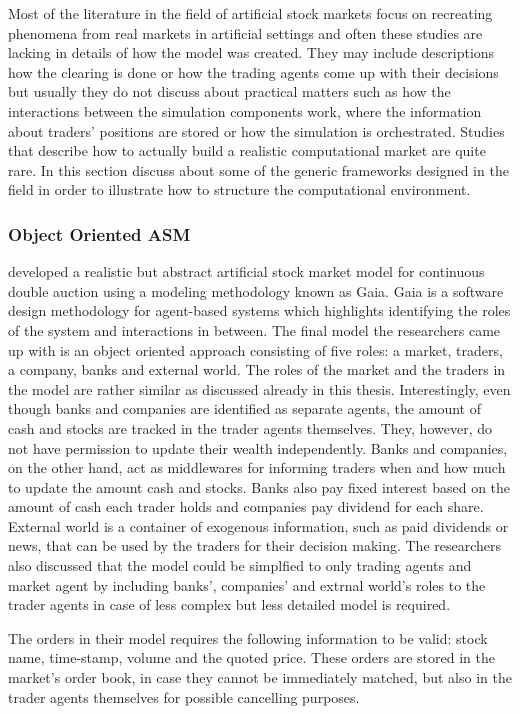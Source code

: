 Most of the literature in the field of artificial stock markets 
focus on recreating phenomena from real markets in artificial settings
and often these studies are lacking in details of how the model was created.
They may include descriptions how the clearing is done or how the trading agents 
come up with their decisions but usually they do not discuss about practical matters 
such as how the interactions between the simulation components work, where the 
information about traders' positions are stored or how the simulation is orchestrated. 
Studies that describe how to actually build a realistic computational 
market are quite rare. In this section discuss about some of the generic
frameworks designed in the field in order to illustrate how to structure the computational
environment.


\subsubsection{Object Oriented ASM}
\citet{Ben12} developed a realistic but abstract artificial stock market
model for continuous double auction using a modeling methodology known as 
Gaia. Gaia is a software design methodology for agent-based systems which 
highlights identifying the roles of the system and interactions in between.
The final model the researchers came up with is an object oriented 
approach consisting of five roles: a market, traders, a company, banks
and external world. The roles of the market and the traders in the model 
are rather similar as discussed already in this thesis. Interestingly,
even though banks and companies are identified as separate agents, 
the amount of cash and stocks are tracked in the trader agents themselves.
They, however, do not have permission to update their wealth independently. 
Banks and companies, on the other hand, act as middlewares for informing 
traders when and how much to update the amount cash and stocks. Banks also pay 
fixed interest based on the amount of cash each trader holds and companies 
pay dividend for each share. External world is a container of exogenous 
information, such as paid dividends or news, that can be used by the traders for 
their decision making. The researchers also discussed that the model could be
simplfied to only trading agents and market agent by including banks', companies' 
and extrnal world's roles to the trader agents in case of less complex but 
less detailed model is required.

The orders in their model requires the following information to be valid:
stock name, time-stamp, volume and the quoted price. These orders are stored
in the market's order book, in case they cannot be immediately matched, but 
also in the trader agents themselves for possible cancelling purposes.

